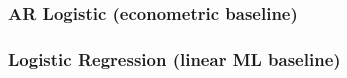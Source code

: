 \documentclass[12pt,a4paper,oneside]{article}
\begin{document}
%
%


\subsubsection{AR Logistic (econometric baseline)}\label{subsubsec:ar}



\subsubsection{Logistic Regression (linear ML baseline)}\label{subsubsec:lr}
\end{document}
